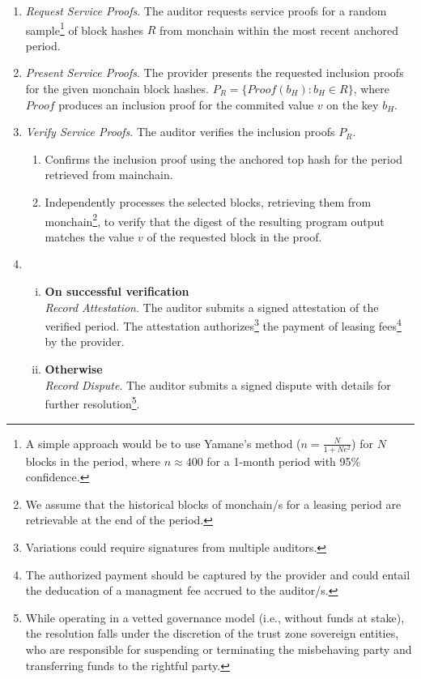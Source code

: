 \documentclass{oc}
\begin{document}
\begin{enumerate}
  \item \emph{Request Service Proofs}. The \gls{auditor} requests service proofs for a random sample\footnote{
    A simple approach would be to use Yamane's method ($n=\frac{N}{1+Ne^2}$) for $N$ blocks in the period, where $n\approx400$ for a 1-month period with 95\% confidence.
  } of block hashes $R$ from \gls{monchain} within the most recent anchored period.
  
  \item \emph{Present Service Proofs}. The \gls{provider} presents the requested inclusion proofs for the given \gls{monchain} block hashes. $P_{R}=\{Proof(b_H) : b_H \in R\}$,
  where $Proof$ produces an inclusion proof for the commited value $v$ on the key $b_H$.
  
  \item \emph{Verify Service Proofs}. The \gls{auditor} verifies the inclusion proofs $P_{R}$.
    \begin{enumerate}
      \item Confirms the inclusion proof using the anchored top hash for the period retrieved from \gls{mainchain}.
      \item Independently processes the selected blocks, retrieving them from \gls{monchain}\footnote{
        We assume that the historical blocks of \gls*{monchain}/s for a leasing period are retrievable at the end of the period.
      }, to verify that the digest of the resulting program output matches the value $v$ of the requested block in the proof.
    \end{enumerate}
  \item
    \begin{enumerate}[(i)]
      \item \textbf{On successful verification} \\
      \emph{Record Attestation}. The \gls{auditor} submits a signed attestation of the verified period. The attestation authorizes\footnote{
        Variations could require signatures from multiple auditors.
      } the payment of leasing fees\footnote{
        The authorized payment should be captured by the \gls{provider} and could entail the deducation of a managment fee accrued to the \gls{auditor}/s.
      } by the \gls{provider}.
      \item \textbf{Otherwise} \\
      \emph{Record Dispute}. The \gls{auditor} submits a signed dispute with details for further resolution\footnote{
        While operating in a vetted governance model (i.e., without funds at stake),
        the resolution falls under the discretion of the trust zone sovereign entities,
        who are responsible for suspending or terminating the misbehaving party and transferring funds to the rightful party.
      }.
    \end{enumerate}

\end{enumerate}
\end{document}
